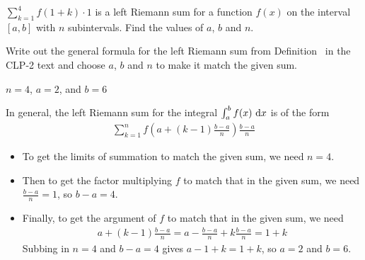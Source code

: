 
\begin{question}[M105 2015A]
$\displaystyle \sum_{k=1}^4 f(1+k)\cdot 1$ is a left Riemann sum for a function $f(x)$ on the interval $[a,b]$ with $n$ subintervals. Find the values of $a$, $b$ and $n$.
\end{question}

\begin{hint}
Write out the general formula for the left Riemann sum from Definition~ in the CLP-2 text and
choose $a$, $b$ and $n$ to make it match the given sum.
\end{hint}

\begin{answer}
$n=4$, $a=2$, and $b=6$
\end{answer}

\begin{solution}
In general, the {left} Riemann sum for the integral $\int_a^b f(x)\,\,\mathrm{d}x$
is of the form
\begin{align*}
\sum_{k=1}^n f\left(a+(k-1)\frac{b-a}{n}\right)\frac{b-a}{n}
\end{align*}

\begin{itemize}
\item
To get the limits of summation to match the given sum, we need $n=4$.
\item
Then to get the factor multiplying $f$ to match that in the given sum,
we need $\frac{b-a}{n}=1$, so $b-a=4$.
\item Finally, to get the argument of $f$ to match that in the given sum,
we need
\begin{align*}
a+(k-1)\frac{b-a}{n}=a-\frac{b-a}{n} +k\frac{b-a}{n}=1+k
\end{align*}
Subbing in $n=4$ and $b-a=4$ gives
$a-1 +k=1+k$, so $a=2$ and $b=6$.
\end{itemize}
\end{solution}



